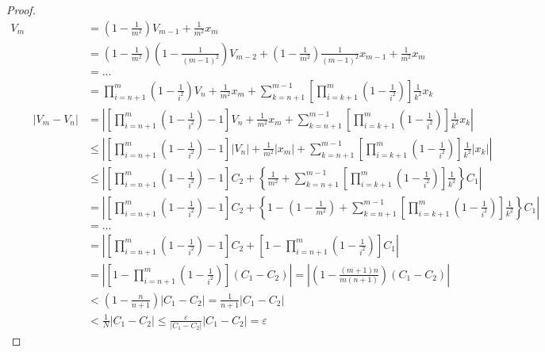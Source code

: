 \documentclass{article}
\begin{document}
\begin{proof}
    \vspace{-2em}
    \begin{align*}
        V_m & = \left(1-\frac{1}{m^2}\right)V_{m-1} + \frac{1}{m^2} x_m \\
        & = \left(1-\frac{1}{m^2}\right)\left(1-\frac{1}{(m-1)^2}\right)V_{m-2}+\left(1-\frac{1}{m^2}\right)\frac{1}{(m-1)^2}x_{m-1}+\frac{1}{m^2}x_m \\
        & = \dots \\
        & = \prod_{i=n+1}^m \left(1-\frac{1}{i^2}\right) V_n + \frac{1}{m^2}x_m + \sum_{k=n+1}^{m-1} \left[\prod_{i=k+1}^m\left(1-\frac{1}{i^2}\right)\right] \frac{1}{k^2} x_k \\
        \qquad 
        \left|V_m - V_n\right| & = \left|\left[\prod_{i=n+1}^m \left(1-\frac{1}{i^2}\right) - 1 \right] V_n + \frac{1}{m^2}x_m + \sum_{k=n+1}^{m-1} \left[\prod_{i=k+1}^m\left(1-\frac{1}{i^2}\right)\right] \frac{1}{k^2} x_k\right| \\
        & \le \left|\left[\prod_{i=n+1}^m \left(1-\frac{1}{i^2}\right) - 1 \right] |V_n| + \frac{1}{m^2}|x_m| + \sum_{k=n+1}^{m-1} \left[\prod_{i=k+1}^m\left(1-\frac{1}{i^2}\right)\right] \frac{1}{k^2} |x_k|\right| \\
        & \le \left|\left[\prod_{i=n+1}^m \left(1-\frac{1}{i^2}\right) - 1 \right] C_2 + \left\{\frac{1}{m^2} + \sum_{k=n+1}^{m-1} \left[\prod_{i=k+1}^m\left(1-\frac{1}{i^2}\right)\right] \frac{1}{k^2} \right\} C_1 \right|\\
        & = \left|\left[\prod_{i=n+1}^m \left(1-\frac{1}{i^2}\right) - 1 \right] C_2 + \left\{1-\left(1-\frac{1}{m^2}\right) + \sum_{k=n+1}^{m-1} \left[\prod_{i=k+1}^{m}\left(1-\frac{1}{i^2}\right)\right] \frac{1}{k^2} \right\}C_1\right| \\
        & = \dots \\
        & = \left|\left[\prod_{i=n+1}^m \left(1-\frac{1}{i^2}\right) - 1 \right] C_2 + \left[1-\prod_{i=n+1}^m \left(1-\frac{1}{i^2}\right)\right] C_1 \right| \\
        & = \left|\left[1-\prod_{i=n+1}^m \left(1-\frac{1}{i^2}\right)\right] \left(C_1-C_2\right) \right| = \left|\left(1-\frac{(m+1)n}{m(n+1)}\right) \left(C_1 - C_2\right)\right| \\
        & < \left(1 - \frac{n}{n+1}\right) \left|C_1-C_2\right| = \frac{1}{n+1}\left|C_1-C_2\right| \\
        & < \frac{1}{N} \left|C_1-C_2\right| \le \frac{\varepsilon}{\left|C_1-C_2\right|} \left|C_1-C_2\right| = \varepsilon
    \end{align*}


\end{proof}
\end{document}

